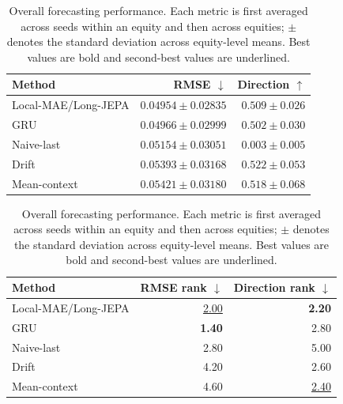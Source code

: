 \begin{table}[t]
\centering
\small
\caption{Overall forecasting performance. Each metric is first averaged across seeds within an equity and then across equities; $\pm$ denotes the standard deviation across equity-level means. Best values are bold and second-best values are underlined.}
\label{tab:main_metrics}
\begin{tabular}{lrr}
\toprule
Method & RMSE $\downarrow$ & Direction $\uparrow$ \\
\midrule
Local-MAE/Long-JEPA & \textbf{$0.04954 \pm 0.02835$} & $0.509 \pm 0.026$ \\
GRU & \underline{$0.04966 \pm 0.02999$} & $0.502 \pm 0.030$ \\
Naive-last & $0.05154 \pm 0.03051$ & $0.003 \pm 0.005$ \\
Drift & $0.05393 \pm 0.03168$ & \textbf{$0.522 \pm 0.053$} \\
Mean-context & $0.05421 \pm 0.03180$ & \underline{$0.518 \pm 0.068$} \\
\bottomrule
\end{tabular}
\par\medskip
\begin{tabular}{lrr}
\toprule
Method & RMSE rank $\downarrow$ & Direction rank $\downarrow$ \\
\midrule
Local-MAE/Long-JEPA & \underline{2.00} & \textbf{2.20} \\
GRU & \textbf{1.40} & 2.80 \\
Naive-last & 2.80 & 5.00 \\
Drift & 4.20 & 2.60 \\
Mean-context & 4.60 & \underline{2.40} \\
\bottomrule
\end{tabular}
\end{table}
